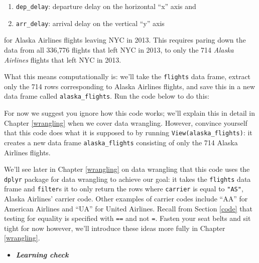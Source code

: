 \documentclass[12pt, krantz2,]{krantz}
\makeatletter
\newenvironment{Shaded}{\begin{snugshade}}{\end{snugshade}}
\newcommand{\KeywordTok}[1]{\textcolor[rgb]{0.27,0.27,0.27}{\textbf{#1}}}
\newcommand{\NormalTok}[1]{#1}
\newcommand{\OperatorTok}[1]{\textcolor[rgb]{0.43,0.43,0.43}{\textbf{#1}}}
\newcommand{\StringTok}[1]{\textcolor[rgb]{0.5,0.5,0.5}{#1}}
\providecommand{\tightlist}{%
  \setlength{\itemsep}{0pt}\setlength{\parskip}{0pt}}
\newenvironment{kframe}{%
\medskip{}
\setlength{\fboxsep}{.8em}
 \def\at@end@of@kframe{}%
 \ifinner\ifhmode%
  \def\at@end@of@kframe{\end{minipage}}%
  \begin{minipage}{\columnwidth}%
 \fi\fi%
 \def\FrameCommand##1{\hskip\@totalleftmargin \hskip-\fboxsep
 \colorbox{shadecolor}{##1}\hskip-\fboxsep
     \hskip-\linewidth \hskip-\@totalleftmargin \hskip\columnwidth}%
 \MakeFramed {\advance\hsize-\width
   \@totalleftmargin\z@ \linewidth\hsize
   \@setminipage}}%
 {\par\unskip\endMakeFramed%
 \at@end@of@kframe}
\renewenvironment{Shaded}{\begin{kframe}}{\end{kframe}}
\newenvironment{rmdblock}[1]
  {\begin{shaded*}
  \begin{itemize}
  \renewcommand{\labelitemi}{
    \raisebox{-.7\height}[0pt][0pt]{
    }
  }
  \item
  }
  {
  \end{itemize}
  \end{shaded*}
  }
\newenvironment{learncheck}
  {\begin{rmdblock}{warning}}
  {\end{rmdblock}}
\makeatother
\begin{document}
\begin{enumerate}
\def\labelenumi{\arabic{enumi}.}
\tightlist
\item
  \texttt{dep\_delay}: departure delay on the horizontal ``x'' axis and
\item
  \texttt{arr\_delay}: arrival delay on the vertical ``y'' axis
\end{enumerate}

for Alaska Airlines flights leaving NYC in 2013. This requires paring down the data from all 336,776 flights that left NYC in 2013, to only the 714 \emph{Alaska Airlines} flights that left NYC in 2013.

What this means computationally is: we'll take the \texttt{flights} data frame, extract only the 714 rows corresponding to Alaska Airlines flights, and save this in a new data frame called \texttt{alaska\_flights}. Run the code below to do this:

\begin{Shaded}
\end{Shaded}

For now we suggest you ignore how this code works; we'll explain this in detail in Chapter \ref{wrangling} when we cover data wrangling. However, convince yourself that this code does what it is supposed to by running \texttt{View(alaska\_flights)}: it creates a new data frame \texttt{alaska\_flights} consisting of only the 714 Alaska Airlines flights.

We'll see later in Chapter \ref{wrangling} on data wrangling that this code uses the \texttt{dplyr} package for data wrangling to achieve our goal: it takes the \texttt{flights} data frame and \texttt{filter}s it to only return the rows where \texttt{carrier} is equal to \texttt{"AS"}, Alaska Airlines' carrier code. Other examples of carrier codes include ``AA'' for American Airlines and ``UA'' for United Airlines. Recall from Section \ref{code} that testing for equality is specified with \texttt{==} and not \texttt{=}. Fasten your seat belts and sit tight for now however, we'll introduce these ideas more fully in Chapter \ref{wrangling}.

\begin{learncheck}
\textbf{\emph{Learning check}}
\end{learncheck}
\end{document}
